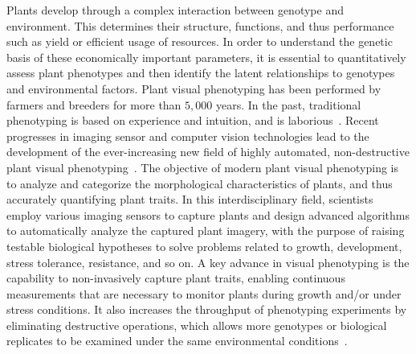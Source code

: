 Plants develop through a complex interaction between genotype and environment.
This determines their structure, functions, and thus performance such as yield or efficient usage of resources.
In order to understand the genetic basis of these economically important parameters, it is essential to quantitatively assess plant phenotypes and then identify the latent relationships to genotypes and environmental factors.
%
Plant visual phenotyping has been performed by farmers and breeders for more than $5,000$ years.
In the past, traditional phenotyping is based on experience and intuition, and is laborious~\cite{johannsenerblichkeit}.
Recent progresses in imaging sensor and computer vision technologies lead to the development of the ever-increasing new field of highly automated, non-destructive plant visual phenotyping~\cite{furbank2011phenomics,cruz2015depi}.
%
The objective of modern plant visual phenotyping is to analyze and categorize the morphological characteristics of plants, and thus accurately quantifying plant traits. %
In this interdisciplinary field, scientists employ various imaging sensors to capture plants and design advanced algorithms to automatically analyze the captured plant imagery, with the purpose of raising testable biological hypotheses to solve problems related to growth, development, stress tolerance, resistance, and so on.
%
%
A key advance in visual phenotyping is the capability to non-invasively capture plant traits, enabling continuous measurements that are necessary to monitor plants during growth and/or under stress conditions. 
It also increases the throughput of phenotyping experiments by eliminating destructive operations, which allows more genotypes or biological replicates to be examined under the same environmental conditions~\cite{fahlgren2015lights,walter2015plant}.

